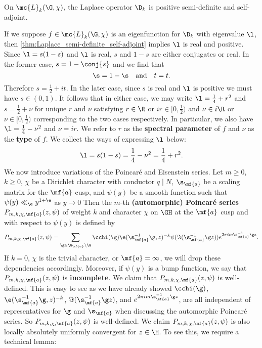     \begin{theorem}\label{thm:Laplace_semi-definite_self-adjoint}
      On $\mc{L}_{k}(\G,\chi)$, the Laplace operator $\D_{k}$ is positive semi-definite and self-adjoint.
    \end{theorem}

    If we suppose $f \in \mc{L}_{k}(\G,\chi)$ is an eigenfunction for $\D_{k}$ with eigenvalue $\l$, then \cref{thm:Laplace_semi-definite_self-adjoint} implies $\l$ is real and positive. Since $\l = s(1-s)$ and $\l$ is real, $s$ and $1-s$ are either conjugates or real. In the former case, $s = 1-\conj{s}$ and we find that
    \[
      \s = 1-\s \quad \text{and} \quad t = t.
    \]
    Therefore $s = \frac{1}{2}+it$. In the later case, since $s$ is real and $\l$ is positive we must have $s \in (0,1)$. It follows that in either case, we may write $\l = \frac{1}{4}+r^{2}$ and $s = \frac{1}{2}+\nu$ for unique $r$ and $\nu$ satisfying $r \in \R$ or $ir \in \big[0,\frac{1}{2}\big)$ and $\nu \in i\R$ or $\nu \in \big[0,\frac{1}{2}\big)$ corresponding to the two cases respectively. In particular, we also have $\l = \frac{1}{4}-\nu^{2}$ and $\nu = ir$. We refer to $r$ as the \textbf{spectral parameter} of $f$ and $\nu$ as the \textbf{type} of $f$. We collect the ways of expressing $\l$ below:
    \[
      \l = s(1-s) = \frac{1}{4}-\nu^{2} = \frac{1}{4}+r^{2}.
    \]
    We now introduce variations of the Poincar\'e and Eisenstein series. Let $m \ge 0$, $k \ge 0$, $\chi$ be a Dirichlet character with conductor $q \mid N$, $\s_{\mf{a}}$ be a scaling matrix for the $\mf{a}$ cusp, and $\psi(y)$ be a smooth function such that $\psi(y) \ll_{\e} y^{1+\e}$ as $y \to 0$ Then the $m$-th \textbf{(automorphic) Poincar\'e series} $P_{m,k,\chi,\mf{a}}(z,\psi)$ of weight $k$ and character $\chi$ on $\GH$ at the $\mf{a}$ cusp and with respect to $\psi(y)$ is defined by
    \[
      P_{m,k,\chi,\mf{a}}(z,\psi) = \sum_{\g \in \G_{\mf{a}}\backslash\G}\cchi(\g)\e(\s_{\mf{a}}^{-1}\g,z)^{-k}\psi(\Im(\s_{\mf{a}}^{-1}\g z))e^{2\pi im\s_{\mf{a}}^{-1}\g z}.
    \]
    If $k = 0$, $\chi$ is the trivial character, or $\mf{a} = \infty$, we will drop these dependencies accordingly. Moreover, if $\psi(y)$ is a bump function, we say that $P_{m,k,\chi,\mf{a}}(z,\psi)$ is \textbf{incomplete}. We claim that $P_{m,k,\chi,\mf{a}}(z,\psi)$ is well-defined. This is easy to see as we have already showed $\cchi(\g)$, $\e(\s_{\mf{a}}^{-1}\g,z)^{-k}$, $\Im(\s_{\mf{a}}^{-1}\g z)$, and $e^{2\pi im\s_{\mf{a}}^{-1}\g z}$, are all independent of representatives for $\g$ and $\s_{\mf{a}}$ when discussing the automorphic Poincar\'e series. So $P_{m,k,\chi,\mf{a}}(z,\psi)$ is well-defined. We claim $P_{m,k,\chi,\mf{a}}(z,\psi)$ is also locally absolutely uniformly convergent for $z \in \H$. To see this, we require a technical lemma:

